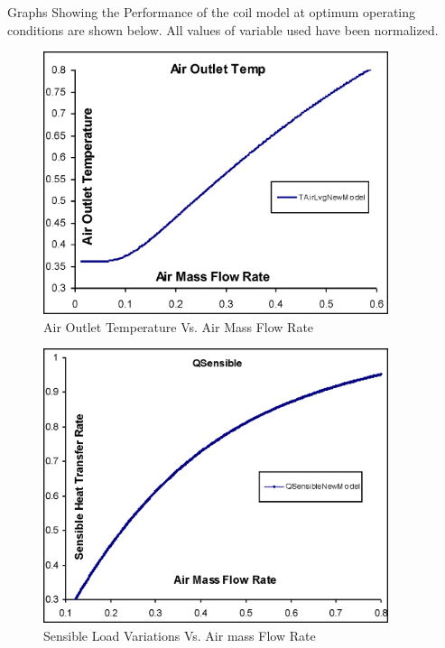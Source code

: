 Graphs Showing the Performance of the coil model at optimum operating conditions are shown below. All values of variable used have been normalized.

\begin{figure}[hbtp] %
\centering
\includegraphics[width=0.9\textwidth, height=0.9\textheight, keepaspectratio=true]{media/image3348.png}
\caption{Air Outlet Temperature Vs. Air Mass Flow Rate \protect \label{fig:air-outlet-temperature-vs-air-mass-flow-rate}}
\end{figure}

\begin{figure}[hbtp] %
\centering
\includegraphics[width=0.9\textwidth, height=0.9\textheight, keepaspectratio=true]{media/image3349.png}
\caption{Sensible Load Variations Vs. Air mass Flow Rate \protect \label{fig:sensible-load-variations-vs-air-mass-flow}}
\end{figure}

